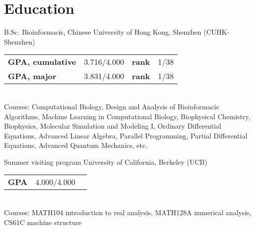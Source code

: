 \documentclass[12pt,a4paper,sans]{moderncv}
\newcommand{\cvsection}[1]{\section{{#1}}}
\begin{document}
\maketitle

\vspace{-1em}
\cvsection{Education}
    {B.Sc.}
    {}
    {Bioinformacis, Chinese University of Hong Kong, Shenzhen (CUHK-Shenzhen)}
    {}
    {\begin{tabular}{@{}lrlr@{}}
        \textbf{GPA, cumulative} & 3.716/4.000 & \textbf{rank} & 1/38\\
        \textbf{GPA, major} & 3.831/4.000      & \textbf{rank} & 1/38
    \end{tabular}\\
    \footnotesize Courses: Computational Biology, Design and Analysis of Bioinformacis Algorithms,
    Machine Learning in Computational Biology, Biophysical Chemistry, Biophysics,
    Molecular Simulation and Modeling I, Ordinary Differential Equations, Advanced Linear Algebra,
    Parallel Programming, Partial Differential Equations, Advanced Quantum Mechanics, etc.}
    {Summer visiting program}
    {}
    {University of California, Berkeley (UCB)}
    {}
    {\begin{tabular}{@{}lrr@{}}
        \textbf{GPA} & 4.000/4.000 &  \\
    \end{tabular}\\
    \footnotesize Courses: MATH104 introduction to real analysis,
    MATH128A numerical analysis, CS61C machine structure\\}
\end{document}
